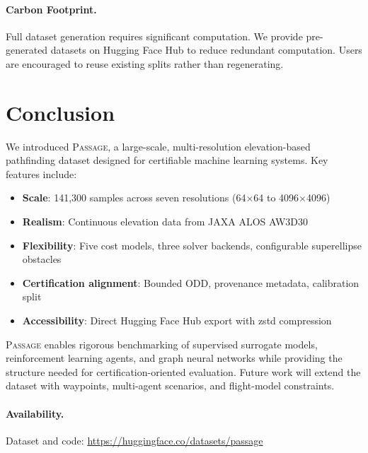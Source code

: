 \documentclass{article}
\newcommand{\dataset}{\textsc{Passage}}
\begin{document}
\paragraph{Carbon Footprint.}
Full dataset generation requires significant computation. We provide pre-generated datasets on Hugging Face Hub to reduce redundant computation. Users are encouraged to reuse existing splits rather than regenerating.

\section{Conclusion}
\label{sec:conclusion}

We introduced \dataset{}, a large-scale, multi-resolution elevation-based pathfinding dataset designed for certifiable machine learning systems. Key features include:

\begin{itemize}[noitemsep]
    \item \textbf{Scale}: 141{,}300 samples across seven resolutions (64$\times$64 to 4096$\times$4096)
    \item \textbf{Realism}: Continuous elevation data from JAXA ALOS AW3D30
    \item \textbf{Flexibility}: Five cost models, three solver backends, configurable superellipse obstacles
    \item \textbf{Certification alignment}: Bounded ODD, provenance metadata, calibration split
    \item \textbf{Accessibility}: Direct Hugging Face Hub export with zstd compression
\end{itemize}

\dataset{} enables rigorous benchmarking of supervised surrogate models, reinforcement learning agents, and graph neural networks while providing the structure needed for certification-oriented evaluation. Future work will extend the dataset with waypoints, multi-agent scenarios, and flight-model constraints.

\paragraph{Availability.} Dataset and code: \url{https://huggingface.co/datasets/passage}

\end{document}
